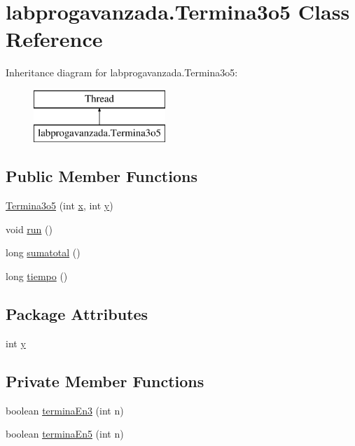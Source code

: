 \hypertarget{classlabprogavanzada_1_1_termina3o5}{}\section{labprogavanzada.\+Termina3o5 Class Reference}
\label{classlabprogavanzada_1_1_termina3o5}
Inheritance diagram for labprogavanzada.\+Termina3o5\+:\begin{figure}[H]
\begin{center}
\leavevmode
\includegraphics[height=2.000000cm]{classlabprogavanzada_1_1_termina3o5}
\end{center}
\end{figure}
\subsection*{Public Member Functions}
\begin{DoxyCompactItemize}
\item 
\mbox{\hyperlink{classlabprogavanzada_1_1_termina3o5_a08aaaf04b3ee2273d33548002521f9be}{Termina3o5}} (int \mbox{\hyperlink{classlabprogavanzada_1_1_termina3o5_a895542b64115c1476a50d623aa2b40dc}{x}}, int \mbox{\hyperlink{classlabprogavanzada_1_1_termina3o5_a3e66f695fc1d536c80f6c6e5404b5715}{y}})
\item 
void \mbox{\hyperlink{classlabprogavanzada_1_1_termina3o5_a356cebcd0a53ff65896f0da242121f6a}{run}} ()
\item 
long \mbox{\hyperlink{classlabprogavanzada_1_1_termina3o5_a731e9939fe2b72fb38c1cd604244e4f8}{sumatotal}} ()
\item 
long \mbox{\hyperlink{classlabprogavanzada_1_1_termina3o5_a9d9fd2a84acb7e0bc24856623f8fb975}{tiempo}} ()
\end{DoxyCompactItemize}
\subsection*{Package Attributes}
\begin{DoxyCompactItemize}
\item 
int \mbox{\hyperlink{classlabprogavanzada_1_1_termina3o5_a3e66f695fc1d536c80f6c6e5404b5715}{y}}
\end{DoxyCompactItemize}
\subsection*{Private Member Functions}
\begin{DoxyCompactItemize}
\item 
boolean \mbox{\hyperlink{classlabprogavanzada_1_1_termina3o5_a2c1157a071b19562e9740dbac68b443d}{termina\+En3}} (int n)
\item 
boolean \mbox{\hyperlink{classlabprogavanzada_1_1_termina3o5_aea7ebcb9dea337e83e865d71e61a525c}{termina\+En5}} (int n)
\end{DoxyCompactItemize}
